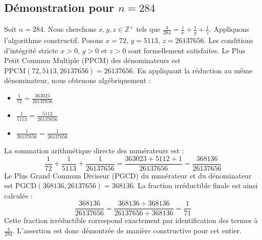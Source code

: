\documentclass[11pt,a4paper]{article}
\begin{document}
\subsection{Démonstration pour $n = 284$}
Soit $n = 284$. Nous cherchons $x, y, z \in \mathbb{Z}^{+}$ tels que $\frac{4}{284} = \frac{1}{x} + \frac{1}{y} + \frac{1}{z}$.
Appliquons l'algorithme constructif. Posons $x = 72$, $y = 5113$, $z = 26137656$.
Les conditions d'intégrité stricte $x > 0$, $y > 0$ et $z > 0$ sont formellement satisfaites.
Le Plus Petit Commun Multiple (PPCM) des dénominateurs est $\text{PPCM}(72, 5113, 26137656) = 26137656$.
En appliquant la réduction au même dénominateur, nous obtenons algébriquement :
\begin{itemize}
    \item $\frac{1}{72} = \frac{363023}{26137656}$
    \item $\frac{1}{5113} = \frac{5112}{26137656}$
    \item $\frac{1}{26137656} = \frac{1}{26137656}$
\end{itemize}
La sommation arithmétique directe des numérateurs est :
$$ \frac{1}{72} + \frac{1}{5113} + \frac{1}{26137656} = \frac{363023 + 5112 + 1}{26137656} = \frac{368136}{26137656} $$
Le Plus Grand Commun Diviseur (PGCD) du numérateur et du dénominateur est $\text{PGCD}(368136, 26137656) = 368136$.
La fraction irréductible finale est ainsi calculée :
$$ \frac{368136}{26137656} = \frac{368136 \div 368136}{26137656 \div 368136} = \frac{1}{71} $$
Cette fraction irréductible correspond exactement par identification des termes à $\frac{4}{284}$. L'assertion est donc démontrée de manière constructive pour cet entier.
\end{document}
